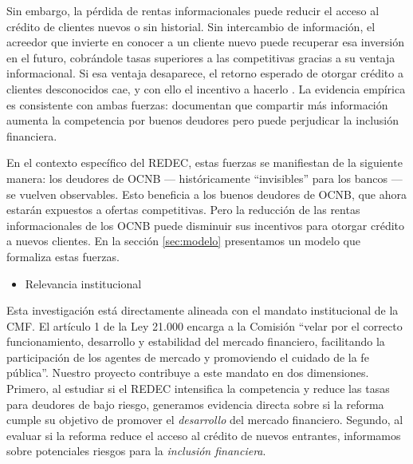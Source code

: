 \documentclass[11pt]{article}
\theoremstyle{plain}
\theoremstyle{plain}
\begin{document}
Sin embargo, la pérdida de rentas informacionales puede reducir el acceso al crédito de clientes nuevos o sin historial. Sin intercambio de información, el acreedor que invierte en conocer a un cliente nuevo puede recuperar esa inversión en el futuro, cobrándole tasas superiores a las competitivas gracias a su ventaja informacional. Si esa ventaja desaparece, el retorno esperado de otorgar crédito a clientes desconocidos cae, y con ello el incentivo a hacerlo \parencite{petersen_effect_1995, dellariccia_information_2004}. La evidencia empírica es consistente con ambas fuerzas: \textcite{foley_effects_2020} documentan que compartir más información aumenta la competencia por buenos deudores pero puede perjudicar la inclusión financiera.

En el contexto específico del REDEC, estas fuerzas se manifiestan de la siguiente manera: los deudores de OCNB --- históricamente ``invisibles'' para los bancos --- se vuelven observables. Esto beneficia a los buenos deudores de OCNB, que ahora estarán expuestos a ofertas competitivas. Pero la reducción de las rentas informacionales de los OCNB puede disminuir sus incentivos para otorgar crédito a nuevos clientes. En la sección \ref{sec:modelo} presentamos un modelo que formaliza estas fuerzas.

\begin{itemize}
    \item Relevancia institucional
\end{itemize}
Esta investigación está directamente alineada con el mandato institucional de la CMF. El artículo 1 de la Ley 21.000 encarga a la Comisión ``velar por el correcto funcionamiento, desarrollo y estabilidad del mercado financiero, facilitando la participación de los agentes de mercado y promoviendo el cuidado de la fe pública''. Nuestro proyecto contribuye a este mandato en dos dimensiones. Primero, al estudiar si el REDEC intensifica la competencia y reduce las tasas para deudores de bajo riesgo, generamos evidencia directa sobre si la reforma cumple su objetivo de promover el \textit{desarrollo} del mercado financiero. Segundo, al evaluar si la reforma reduce el acceso al crédito de nuevos entrantes, informamos sobre potenciales riesgos para la \textit{inclusión financiera}.




\end{document}
